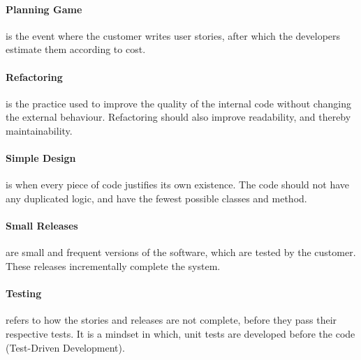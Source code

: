 \paragraph{Planning Game} is the event where the customer writes user stories, after which the developers estimate them according to cost.

\paragraph{Refactoring} is the practice used to improve the quality of the internal code without changing the external behaviour. Refactoring should also improve readability, and thereby maintainability.

\paragraph{Simple Design} is when every piece of code justifies its own existence. The code should not have any duplicated logic, and have the fewest possible classes and method. %

\paragraph{Small Releases} are small and frequent versions of the software, which are tested by the customer.
These releases incrementally complete the system.

\paragraph{Testing} refers to how the stories and releases are not complete, before they pass their respective tests. It is a mindset in which, unit tests are developed before the code (Test-Driven Development).

